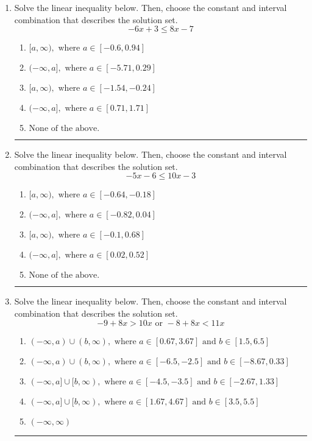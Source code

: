\documentclass[14pt]{extbook}
\newcommand{\litem}[1]{\item#1\hspace*{-1cm}\rule{\textwidth}{0.4pt}}
\begin{document}
\begin{enumerate}
\litem{
Solve the linear inequality below. Then, choose the constant and interval combination that describes the solution set.\[ -6x + 3 \leq 8x -7 \]\begin{enumerate}[label=\Alph*.]
\item \( [a, \infty), \text{ where } a \in [-0.6, 0.94] \)
\item \( (-\infty, a], \text{ where } a \in [-5.71, 0.29] \)
\item \( [a, \infty), \text{ where } a \in [-1.54, -0.24] \)
\item \( (-\infty, a], \text{ where } a \in [0.71, 1.71] \)
\item \( \text{None of the above}. \)

\end{enumerate} }
\litem{
Solve the linear inequality below. Then, choose the constant and interval combination that describes the solution set.\[ -5x -6 \leq 10x -3 \]\begin{enumerate}[label=\Alph*.]
\item \( [a, \infty), \text{ where } a \in [-0.64, -0.18] \)
\item \( (-\infty, a], \text{ where } a \in [-0.82, 0.04] \)
\item \( [a, \infty), \text{ where } a \in [-0.1, 0.68] \)
\item \( (-\infty, a], \text{ where } a \in [0.02, 0.52] \)
\item \( \text{None of the above}. \)

\end{enumerate} }
\litem{
Solve the linear inequality below. Then, choose the constant and interval combination that describes the solution set.\[ -9 + 8 x > 10 x \text{ or } -8 + 8 x < 11 x \]\begin{enumerate}[label=\Alph*.]
\item \( (-\infty, a) \cup (b, \infty), \text{ where } a \in [0.67, 3.67] \text{ and } b \in [1.5, 6.5] \)
\item \( (-\infty, a) \cup (b, \infty), \text{ where } a \in [-6.5, -2.5] \text{ and } b \in [-8.67, 0.33] \)
\item \( (-\infty, a] \cup [b, \infty), \text{ where } a \in [-4.5, -3.5] \text{ and } b \in [-2.67, 1.33] \)
\item \( (-\infty, a] \cup [b, \infty), \text{ where } a \in [1.67, 4.67] \text{ and } b \in [3.5, 5.5] \)
\item \( (-\infty, \infty) \)


\end{enumerate}}
\end{enumerate}
\end{document}
